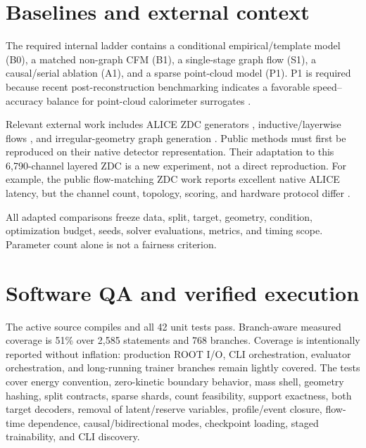 \documentclass[10pt,a4paper]{article}
\begin{document}
\section{Baselines and external context}

The required internal ladder contains a conditional empirical/template model (B0), a matched non-graph CFM (B1), a single-stage graph flow (S1), a causal/serial ablation (A1), and a sparse point-cloud model (P1). P1 is required because recent post-reconstruction benchmarking indicates a favorable speed--accuracy balance for point-cloud calorimeter surrogates \cite{full_physics_benchmark,calopointflow2}.

Relevant external work includes ALICE ZDC generators \cite{alice_zdc_ml,wojnar_zdc,faster_zdc,expertsim}, inductive/layerwise flows \cite{icaloflow,l2lflows}, and irregular-geometry graph generation \cite{calograph}. Public methods must first be reproduced on their native detector representation. Their adaptation to this 6,790-channel layered ZDC is a new experiment, not a direct reproduction. For example, the public flow-matching ZDC work reports excellent native ALICE latency, but the channel count, topology, scoring, and hardware protocol differ \cite{faster_zdc}.

All adapted comparisons freeze data, split, target, geometry, condition, optimization budget, seeds, solver evaluations, metrics, and timing scope. Parameter count alone is not a fairness criterion.

\section{Software QA and verified execution}

The active source compiles and all 42 unit tests pass. Branch-aware measured coverage is 51\% over 2,585 statements and 768 branches. Coverage is intentionally reported without inflation: production ROOT I/O, CLI orchestration, evaluator orchestration, and long-running trainer branches remain lightly covered. The tests cover energy convention, zero-kinetic boundary behavior, mass shell, geometry hashing, split contracts, sparse shards, count feasibility, support exactness, both target decoders, removal of latent/reserve variables, profile/event closure, flow-time dependence, causal/bidirectional modes, checkpoint loading, staged trainability, and CLI discovery.
\end{document}
